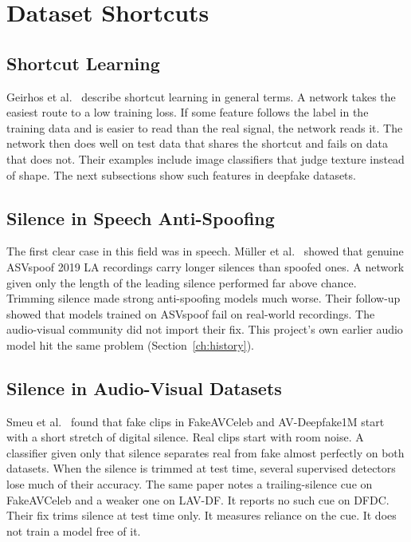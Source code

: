 \section{Dataset Shortcuts}
\label{sec:l-shortcuts}

\subsection{Shortcut Learning}

Geirhos et al.~\cite{shortcut} describe shortcut learning in general terms. A
network takes the easiest route to a low training loss. If some feature
follows the label in the training data and is easier to read than the real
signal, the network reads it. The network then does well on test data that
shares the shortcut and fails on data that does not. Their examples include
image classifiers that judge texture instead of shape. The next subsections
show such features in deepfake datasets.

\subsection{Silence in Speech Anti-Spoofing}

The first clear case in this field was in speech. M\"uller et al.~\cite{mueller2021}
showed that genuine ASVspoof 2019 LA recordings carry longer silences than
spoofed ones. A network given only the length of the leading silence performed
far above chance. Trimming silence made strong anti-spoofing models much
worse. Their follow-up~\cite{mueller2022} showed that models trained on
ASVspoof fail on real-world recordings. The audio-visual community did not
import their fix. This project's own earlier audio model hit the same problem
(Section~\ref{ch:history}).

\subsection{Silence in Audio-Visual Datasets}

Smeu et al.~\cite{smeu2025} found that fake clips in FakeAVCeleb and
AV-Deepfake1M start with a short stretch of digital silence. Real clips start
with room noise. A classifier given only that silence separates real from fake
almost perfectly on both datasets. When the silence is trimmed at test time,
several supervised detectors lose much of their accuracy. The same paper notes
a trailing-silence cue on FakeAVCeleb and a weaker one on LAV-DF. It reports
no such cue on DFDC. Their fix trims silence at test time only. It measures
reliance on the cue. It does not train a model free of it.

